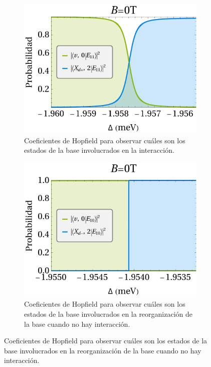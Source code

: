 \documentclass[main.tex]{subfiles}
\begin{document}
\begin{figure}[htbp]
	\begin{subfigure}[b]{0.49\textwidth}
		\centering
		\includegraphics[width=\textwidth]{res/h11_B0}
		\caption{Coeficientes de Hopfield para observar cuáles son los estados de la base involucrados en la interacción.}
		\label{fig:sh11_B0}
	\end{subfigure}
	\hfill
	\begin{subfigure}[b]{0.49\textwidth}
		\centering
		\includegraphics[width=\textwidth]{res/h10_B0}
		\caption{Coeficientes de Hopfield para observar cuáles son los estados de la base involucrados en la reorganización de la base cuando no hay interacción.}
		\label{fig:h10_B0}
	\end{subfigure}

\end{figure}
\end{document}
